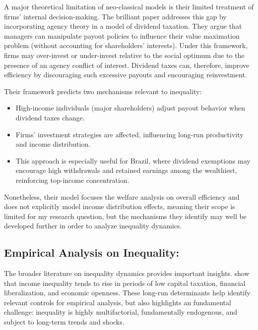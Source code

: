 \documentclass[11pt,a4paper]{article}
\begin{document}
\par

A major theoretical limitation of neo-classical models is their limited treatment of firms’ internal decision-making. 
The brilliant paper \cite{chetty_agency_2007} addresses this gap by incorporating agency theory in a model of dividend taxation. 
They argue that managers can manipulate payout policies to influence their value maximation problem (without accounting for shareholders’ interests).
Under this framework, firms may over-invest or under-invest relative to the social optimum due to the presence of an agency conflict of interest.
Dividend taxes can, therefore, improve efficiency by discouraging such excessive payouts and encouraging reinvestment.

Their framework predicts two mechanisms relevant to inequality:

\begin{itemize}[leftmargin= 2cm]
    \item High-income individuals (major shareholders) adjust payout behavior when dividend taxes change.
    \item Firms’ investment strategies are affected, influencing long-run productivity and income distribution.
    \item This approach is especially useful for Brazil, where dividend exemptions may encourage high withdrawals and retained earnings among the wealthiest, reinforcing top-income concentration.
\end{itemize}

\par
Nonetheless, their model focuses the welfare analysis on overall efficiency and does not explicitly model income distribution effects, meaning their scope is limited for my research question, but the mechanisms they identify may well be developed further in order to analyze inequality dynamics.
\subsection{ Empirical Analysis on Inequality:}

\par
The broader literature on inequality dynamics provides important insights. \cite{roine2009long} show that income inequality tends to rise in periods of low capital taxation, financial liberalization, and economic openness. 
These long-run determinants help identify relevant controls for empirical analysis, but also highlights an fundamental challenge: inequality is highly multifactorial, fundamentally endogenous, and subject to long-term trends and shocks.
\end{document}
